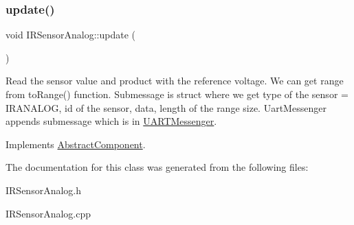 \subsubsection{\texorpdfstring{update()}{update()}}
{\footnotesize\ttfamily void I\+R\+Sensor\+Analog\+::update (\begin{DoxyParamCaption}{ }\end{DoxyParamCaption})\hspace{0.3cm}{\ttfamily [virtual]}}

Read the sensor value and product with the reference voltage. We can get range from to\+Range() function. Submessage is struct where we get type of the sensor = I\+R\+A\+N\+A\+L\+OG, id of the sensor, data, length of the range size. Uart\+Messenger appends submessage which is in \hyperlink{class_u_a_r_t_messenger}{U\+A\+R\+T\+Messenger}. 

Implements \hyperlink{class_abstract_component}{Abstract\+Component}.



The documentation for this class was generated from the following files\+:\begin{DoxyCompactItemize}
\item 
I\+R\+Sensor\+Analog.\+h\item 
I\+R\+Sensor\+Analog.\+cpp\end{DoxyCompactItemize}
